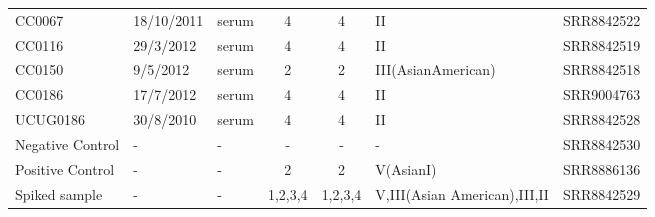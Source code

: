 \begin{table}[h!]
{\begin{tabular}{@{}lllccll@{}}
CC0067           & 18/10/2011 & serum  & 4 & 4 & II                 & SRR8842522 \\
CC0116           & 29/3/2012  & serum  & 4 & 4 & II                 & SRR8842519 \\
CC0150           & 9/5/2012   & serum  & 2 & 2 & III(AsianAmerican) & SRR8842518 \\
CC0186           & 17/7/2012  & serum  & 4 & 4 & II                 & SRR9004763 \\
UCUG0186         & 30/8/2010  & serum  & 4 & 4 & II                 & SRR8842528 \\
Negative Control & -          & -      & - & - & -                  & SRR8842530 \\
Positive Control & -          & -      & 2 & 2 & V(AsianI)          & SRR8886136 \\
Spiked   sample & -                          & -               & 1,2,3,4                    & 1,2,3,4           & V,III(Asian American),III,II & SRR8842529             \\ \bottomrule
\end{tabular}%
}
\end{table}
